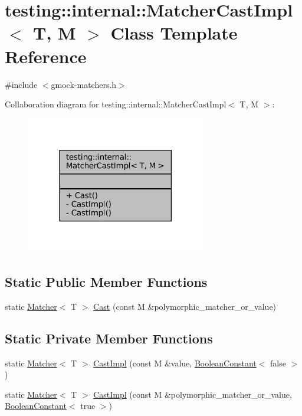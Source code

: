 \hypertarget{classtesting_1_1internal_1_1MatcherCastImpl}{}\section{testing\+:\+:internal\+:\+:Matcher\+Cast\+Impl$<$ T, M $>$ Class Template Reference}
\label{classtesting_1_1internal_1_1MatcherCastImpl}


{\ttfamily \#include $<$gmock-\/matchers.\+h$>$}



Collaboration diagram for testing\+:\+:internal\+:\+:Matcher\+Cast\+Impl$<$ T, M $>$\+:
\nopagebreak
\begin{figure}[H]
\begin{center}
\leavevmode
\includegraphics[width=222pt]{classtesting_1_1internal_1_1MatcherCastImpl__coll__graph}
\end{center}
\end{figure}
\subsection*{Static Public Member Functions}
\begin{DoxyCompactItemize}
\item 
static \hyperlink{classtesting_1_1Matcher}{Matcher}$<$ T $>$ \hyperlink{classtesting_1_1internal_1_1MatcherCastImpl_a488bb69a7845f9198bbb198d8dbe41a8}{Cast} (const M \&polymorphic\+\_\+matcher\+\_\+or\+\_\+value)
\end{DoxyCompactItemize}
\subsection*{Static Private Member Functions}
\begin{DoxyCompactItemize}
\item 
static \hyperlink{classtesting_1_1Matcher}{Matcher}$<$ T $>$ \hyperlink{classtesting_1_1internal_1_1MatcherCastImpl_a378d5cc463b518803c8fddb16f12e1ab}{Cast\+Impl} (const M \&value, \hyperlink{structtesting_1_1internal_1_1BooleanConstant}{Boolean\+Constant}$<$ false $>$)
\item 
static \hyperlink{classtesting_1_1Matcher}{Matcher}$<$ T $>$ \hyperlink{classtesting_1_1internal_1_1MatcherCastImpl_a7eef3c9675414f138bf27def2fccd2c7}{Cast\+Impl} (const M \&polymorphic\+\_\+matcher\+\_\+or\+\_\+value, \hyperlink{structtesting_1_1internal_1_1BooleanConstant}{Boolean\+Constant}$<$ true $>$)
\end{DoxyCompactItemize}


